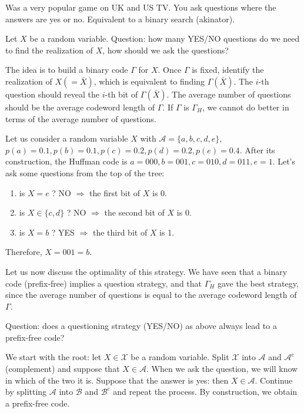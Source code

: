 \documentclass{report}
\begin{document}
\begin{exmp}
	Was a very popular game on UK and US TV. You ask questions where the answers are yes or no. Equivalent to a binary search (akinator). \par
	Let $X$ be a random variable. Question: how many YES/NO questions do we need to find the realization of $X$, how should we ask the questions? \par
	The idea is to build a binary code $\Gamma$ for $X$. Once $\Gamma$ is fixed, identify the realization of $X (= \bar X)$, which is equivalent to finding $\Gamma(\bar X)$. The $i$-th question should reveal the $i$-th bit of $\Gamma(\bar X)$. The average number of questions should be the average codeword length of $\Gamma$. If $\Gamma$ is $\Gamma_H$, we cannot do better in terms of the average number of questions. \par
	Let us consider a random variable $X$ with $\mathcal A = \{a, b, c, d, e\}$, $p(a) = 0.1, p(b) = 0.1, p(c) = 0.2, p(d) = 0.2, p(e) = 0.4$. After its construction, the Huffman code is $a = 000, b = 001, c = 010, d = 011, e = 1$. Let's ask some questions from the top of the tree:
	\begin{enumerate}
		\item is $X = e$ ? NO $\Rightarrow$ the first bit of $X$ is 0.
		\item is $X \in \{c, d\}$ ? NO $\Rightarrow$ the second bit of $X$ is 0.
		\item is $X = b$ ? YES $\Rightarrow$ the third bit of $X$ is 1.
	\end{enumerate}
	Therefore, $X = 001 = b$. \par
	Let us now discuss the optimality of this strategy. We have seen that a binary code (prefix-free) implies a question strategy, and that $\Gamma_H$ gave the best strategy, since the average number of questions is equal to the average codeword length of $\Gamma$. \par
	Question: does a questioning strategy (YES/NO) as above always lead to a prefix-free code? \par
	We start with the root: let $X \in \mathcal X$ be a random variable. Split $\mathcal X$ into $\mathcal A$ and $\mathcal A^c$ (complement) and suppose that $X \in \mathcal A$. When we ask the question, we will know in which of the two it is. Suppose that the answer is yes: then $X \in \mathcal A$. Continue by splitting $\mathcal A$ into $\mathcal B$ and $\mathcal B^c$ and repeat the process. By construction, we obtain a prefix-free code.
\end{exmp}
\end{document}

